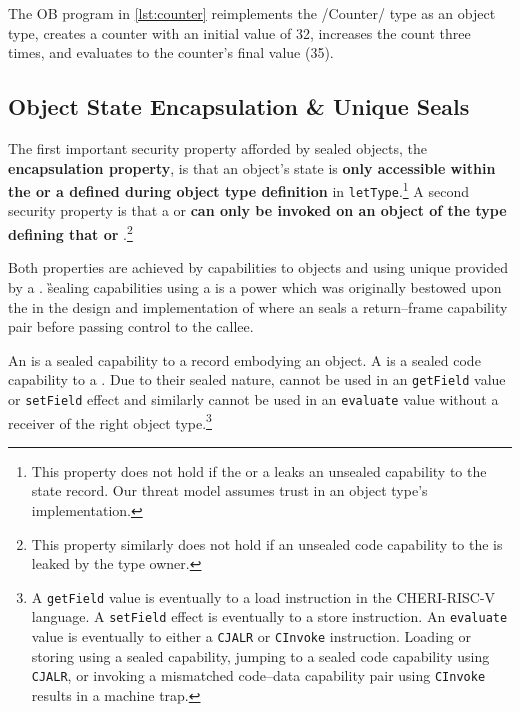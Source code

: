 \documentclass[main.tex]{subfiles}
\begin{document}
The OB program in \cref{lst:counter} reimplements the \iil/Counter/ type as an object type, creates a counter with an initial value of 32, increases the count three times, and evaluates to the counter's final value (35).
\begin{listing}[ht]
	\caption{An OB program implementing a counter and counting from 32 to 35. The \iil/evaluate(message(counter, increase),)/ syntax is valid in Glyco 1.0 and is introduced in the next chapter. The equivalent syntax in this chapter's version (Glyco 0.3) is \iil/message(counter, increase,)/. Additionally, initialisers in Glyco 0.3 receive a pre-allocated record in \iil/self/ while initialisers in the final version (shown here) allocate themselves a record.}
	\label{lst:counter}
\end{listing}

\subsection{Object State Encapsulation \& Unique Seals} \label{sct:obj-sec}
The first important security property afforded by sealed objects, the \textbf{encapsulation property}, is that an object's state is \textbf{only accessible within the  or a  defined during object type definition} in \texttt{letType}.\footnote{This property does not hold if the  or a  leaks an unsealed capability to the state record. Our threat model assumes trust in an object type's implementation.} A second security property is that a  or  \textbf{can only be invoked on an object of the type defining that  or }.\footnote{This property similarly does not hold if an unsealed code capability to the  is leaked by the type owner.}

Both properties are achieved by  capabilities to objects and  using unique  provided by a . \G{sealing} capabilities using a  is a power which was originally bestowed upon the  in the design and implementation of  where an  seals a return–frame capability pair before passing control to the callee.

An \textbf{} is a sealed capability to a record embodying an object. A \textbf{} is a sealed code capability to a . Due to their sealed nature,  cannot be used in an \texttt{getField} value or \texttt{setField} effect and similarly  cannot be used in an \texttt{evaluate} value without a receiver of the right object type.\footnote{A \texttt{getField} value is eventually \lowered{} to a load instruction in the CHERI-RISC-V language. A \texttt{setField} effect is eventually \lowered{} to a store instruction. An \texttt{evaluate} value is eventually \lowered{} to either a \texttt{CJALR} or \texttt{CInvoke} instruction. Loading or storing using a sealed capability, jumping to a sealed code capability using \texttt{CJALR}, or invoking a mismatched code–data capability pair using \texttt{CInvoke} results in a machine trap.}
\end{document}
